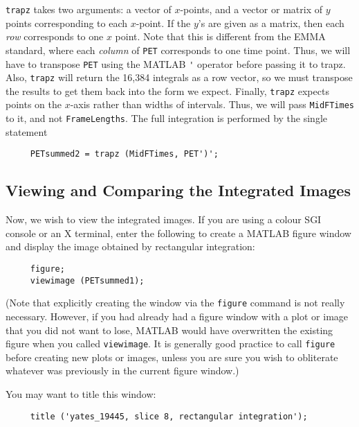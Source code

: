 \verb|trapz| takes two arguments: a vector of $x$-points, and a vector
or matrix of $y$ points corresponding to each $x$-point.  If the $y$'s
are given as a matrix, then each {\em row} corresponds to one $x$
point.  Note that this is different from the EMMA standard, where each
{\em column} of \verb|PET| corresponds to one time point.  Thus, we
will have to transpose \verb|PET| using the MATLAB \verb|'| operator
before passing it to trapz.  Also, \verb|trapz| will return the 16,384
integrals as a row vector, so we must transpose the results to get
them back into the form we expect.  Finally, \verb|trapz| expects
points on the $x$-axis rather than widths of intervals.  Thus, we will
pass \verb|MidFTimes| to it, and not \verb|FrameLengths|.  The full
integration is performed by the single statement
\begin{verbatim}
     PETsummed2 = trapz (MidFTimes, PET')';
\end{verbatim}

\subsection{Viewing and Comparing the Integrated Images}

Now, we wish to view the integrated images.  If you are using a colour
SGI console or an X terminal, enter the following to create a MATLAB
figure window and display the image obtained by rectangular
integration:
\begin{verbatim}
     figure;
     viewimage (PETsummed1);
\end{verbatim}
(Note that explicitly creating the window via the \verb|figure|
command is not really necessary.  However, if you had already had a
figure window with a plot or image that you did not want to lose,
MATLAB would have overwritten the existing figure when you called
\verb|viewimage|.  It is generally good practice to call \verb|figure|
before creating new plots or images, unless you are sure you wish to
obliterate whatever was previously in the current figure window.)

You may want to title this window:
\begin{verbatim}
     title ('yates_19445, slice 8, rectangular integration');
\end{verbatim}

